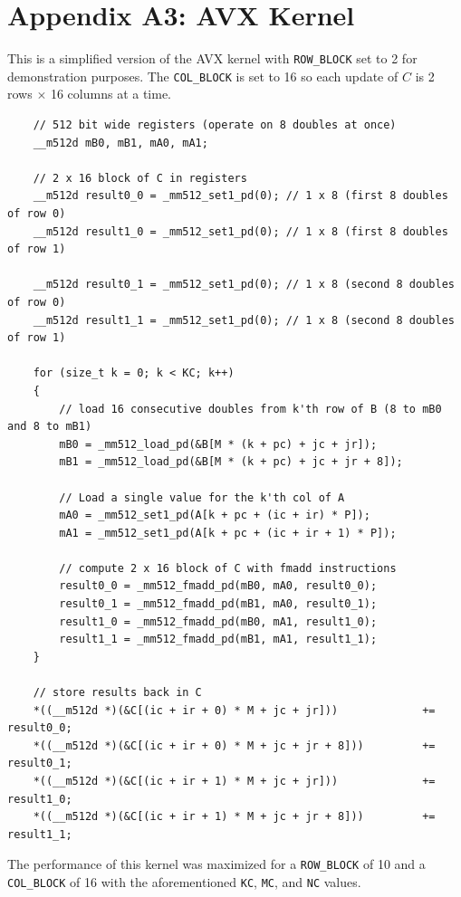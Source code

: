 \documentclass{article}
\begin{document}
\section{Appendix A3: AVX Kernel}
This is a simplified version of the AVX kernel with \texttt{ROW\_BLOCK} set to 2 for demonstration purposes. 
The \texttt{COL\_BLOCK} is set to 16 so each update of $C$ is 2 rows $\times$ 16 columns at a time. 
\begin{lstlisting}
    // 512 bit wide registers (operate on 8 doubles at once)
    __m512d mB0, mB1, mA0, mA1;
    
    // 2 x 16 block of C in registers
    __m512d result0_0 = _mm512_set1_pd(0); // 1 x 8 (first 8 doubles of row 0)
    __m512d result1_0 = _mm512_set1_pd(0); // 1 x 8 (first 8 doubles of row 1)

    __m512d result0_1 = _mm512_set1_pd(0); // 1 x 8 (second 8 doubles of row 0)
    __m512d result1_1 = _mm512_set1_pd(0); // 1 x 8 (second 8 doubles of row 1)

    for (size_t k = 0; k < KC; k++)
    {
        // load 16 consecutive doubles from k'th row of B (8 to mB0 and 8 to mB1)
        mB0 = _mm512_load_pd(&B[M * (k + pc) + jc + jr]);
        mB1 = _mm512_load_pd(&B[M * (k + pc) + jc + jr + 8]);
    
        // Load a single value for the k'th col of A
        mA0 = _mm512_set1_pd(A[k + pc + (ic + ir) * P]);
        mA1 = _mm512_set1_pd(A[k + pc + (ic + ir + 1) * P]);
    
        // compute 2 x 16 block of C with fmadd instructions
        result0_0 = _mm512_fmadd_pd(mB0, mA0, result0_0);
        result0_1 = _mm512_fmadd_pd(mB1, mA0, result0_1);
        result1_0 = _mm512_fmadd_pd(mB0, mA1, result1_0);
        result1_1 = _mm512_fmadd_pd(mB1, mA1, result1_1);
    }
    
    // store results back in C
    *((__m512d *)(&C[(ic + ir + 0) * M + jc + jr]))             += result0_0;
    *((__m512d *)(&C[(ic + ir + 0) * M + jc + jr + 8]))         += result0_1;
    *((__m512d *)(&C[(ic + ir + 1) * M + jc + jr]))             += result1_0;
    *((__m512d *)(&C[(ic + ir + 1) * M + jc + jr + 8]))         += result1_1;
\end{lstlisting}
The performance of this kernel was maximized for a \texttt{ROW\_BLOCK} of 10 and a \texttt{COL\_BLOCK} of 16 with 
the aforementioned \texttt{KC}, \texttt{MC}, and \texttt{NC} values. 

\newpage


\end{document}
